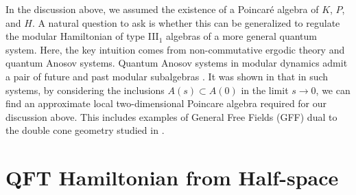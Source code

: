 \documentclass[a4paper,11pt]{article}
\theoremstyle{definition}
\begin{document}
In the discussion above, we assumed the existence of a Poincaré algebra of $K$, $P$, and $H$. A natural question to ask is whether this can be generalized to regulate the modular Hamiltonian of type III$_1$ algebras of a more general quantum system. Here, the key intuition comes from non-commutative ergodic theory and quantum Anosov systems. Quantum Anosov systems in modular dynamics admit a pair of future and past modular subalgebras \cite{ouseph2024local}. It was shown in \cite{ouseph2024local} that in such systems, by considering the inclusions $A(s)\subset A(0)$ in the limit $s\to 0$, we can find an approximate local two-dimensional Poincare algebra required for our discussion above. 
This includes examples of General Free Fields (GFF) dual to the double cone geometry studied in \cite{chen2024comments}.

\section{QFT Hamiltonian from Half-space}\label{sec:Rindler}
\end{document}
